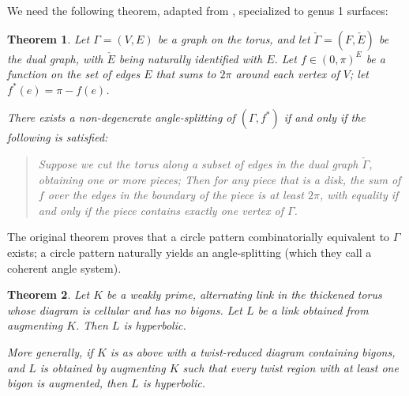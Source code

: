 \documentclass[11pt]{amsart}
\theoremstyle{plain}
\newtheorem{theorem}{Theorem}[section]
\theoremstyle{definition}
\begin{document}
We need the following theorem,
adapted from \cite[Theorem 4]{BandS},
specialized to genus 1 surfaces:


\begin{theorem}{\cite[Theorem 4]{BandS}}
Let $\Gamma = (V,E)$ be a graph on the torus,
and let $\check{\Gamma} = (F,\check{E})$ be the dual graph,
with $\check{E}$ being naturally identified with $E$.
Let $f \in (0,\pi)^E$
be a function on the set of edges $E$
that sums to $2\pi$ around each vertex of $V$;
let $f^*(e) = \pi - f(e)$.


There exists a non-degenerate
angle-splitting of $(\Gamma,f^*)$
if and only if the following is satisfied:

\begin{quotation}
Suppose we cut the torus along a subset of edges in the dual graph
$\check{\Gamma}$, obtaining one or more pieces;
Then for any piece that is a disk,
the sum of $f$ over the edges in the boundary
of the piece is at least $2\pi$,
with equality if and only if the piece
contains exactly one vertex of $\Gamma$.
\end{quotation}

\label{t:bs-thm4}
\end{theorem}

The original theorem \cite[Theorem 4]{BandS}
proves that a circle pattern combinatorially equivalent to $\Gamma$
exists; a circle pattern naturally yields
an angle-splitting (which they call a coherent angle system).


\begin{theorem}
\label{t:auglink_hyp}
Let $K$ be a weakly prime, alternating link
in the thickened torus
whose diagram is cellular and has no bigons.
Let $L$ be a link obtained from augmenting $K$.
Then $L$ is hyperbolic.


More generally, if $K$ is as above with a twist-reduced diagram
containing bigons,
and $L$ is obtained by augmenting $K$
such that every twist region with at least one bigon is augmented,
then $L$ is hyperbolic.
\end{theorem}
\end{document}
